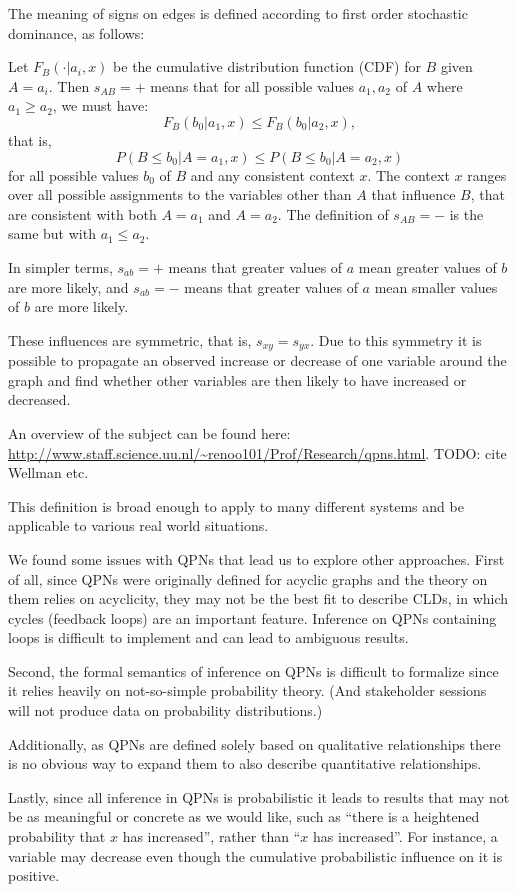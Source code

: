 \documentclass[a4paper,11pt]{article}
\begin{document}
The meaning of signs on edges is defined according to first order
stochastic dominance, as follows:

Let $F_B(\cdot|a_i, x)$ be the cumulative distribution function (CDF) for
$B$ given $A=a_i$. Then $s_{AB}=+$ means that for all possible values
$a_1,a_2$ of $A$ where $a_1\geq a_2$, we must have:
\[F_B(b_0|a_1, x)\leq F_B(b_0|a_2, x),\]
that is,
\[P(B \leq b_0| A = a_1, x)\leq P(B\leq b_0| A = a_2, x)\]
for all possible values $b_0$ of $B$ and any consistent context $x$.
The context $x$ ranges over all possible assignments to the
variables other than $A$ that influence $B$, that are consistent with both
$A=a_1$ and $A=a_2$.
%
The definition of $s_{AB}=-$ is the same but with $a_1\leq a_2$.

In simpler terms, $s_{ab} = +$ means that greater values of $a$ mean
greater values of $b$ are more likely, and $s_{ab}=-$ means that
greater values of $a$ mean smaller values of $b$ are more likely.

These influences are symmetric, that is, $s_{xy}=s_{yx}$.
%
Due to this symmetry it is possible to propagate an observed increase
or decrease of one variable around the graph and find whether other
variables are then likely to have increased or decreased.

An overview of the subject can be found here:
\url{http://www.staff.science.uu.nl/~renoo101/Prof/Research/qpns.html}.
TODO: cite Wellman etc.

This definition is broad enough to
apply to many different systems and
be applicable to various real world situations.

We found some issues with QPNs that lead us to explore other
approaches.
%
First of all, since QPNs were originally defined for acyclic graphs
and the theory on them relies on acyclicity, they may not be the best
fit to describe CLDs, in which cycles (feedback loops) are an important
feature.
%
Inference on QPNs containing loops is difficult to implement and can
lead to ambiguous results.

Second, the formal semantics of inference on QPNs is difficult to
formalize since it relies heavily on not-so-simple probability theory.
%
(And stakeholder sessions will not produce data on probability
distributions.)

Additionally, as QPNs are defined solely based on qualitative
relationships there is no obvious way to expand them to also describe
quantitative relationships.

Lastly, since all inference in QPNs is probabilistic it leads to
results that may not be as meaningful or concrete as we would like,
such as ``there is a heightened probability that $x$ has increased'',
rather than ``$x$ has increased''.
%
For instance, a variable may decrease even though the cumulative
probabilistic influence on it is positive.
\end{document}
